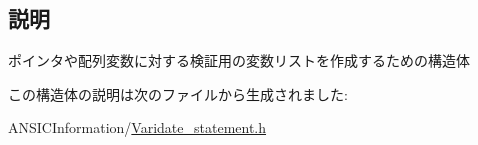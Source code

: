 \subsection{説明}
ポインタや配列変数に対する検証用の変数リストを作成するための構造体 

この構造体の説明は次のファイルから生成されました:\begin{DoxyCompactItemize}
\item 
ANSICInformation/\hyperlink{Varidate__statement_8h}{Varidate\_\-statement.h}\end{DoxyCompactItemize}
